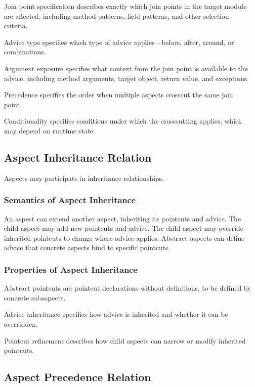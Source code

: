 \documentclass[11pt]{article}
\begin{document}
Join point specification describes exactly which join points in the target module are affected, including method patterns, field patterns, and other selection criteria.

Advice type specifies which type of advice applies---before, after, around, or combinations.

Argument exposure specifies what context from the join point is available to the advice, including method arguments, target object, return value, and exceptions.

Precedence specifies the order when multiple aspects crosscut the same join point.

Conditionality specifies conditions under which the crosscutting applies, which may depend on runtime state.

\subsection{Aspect Inheritance Relation}

Aspects may participate in inheritance relationships.

\subsubsection{Semantics of Aspect Inheritance}

An aspect can extend another aspect, inheriting its pointcuts and advice. The child aspect may add new pointcuts and advice. The child aspect may override inherited pointcuts to change where advice applies. Abstract aspects can define advice that concrete aspects bind to specific pointcuts.

\subsubsection{Properties of Aspect Inheritance}

Abstract pointcuts are pointcut declarations without definitions, to be defined by concrete subaspects.

Advice inheritance specifies how advice is inherited and whether it can be overridden.

Pointcut refinement describes how child aspects can narrow or modify inherited pointcuts.

\subsection{Aspect Precedence Relation}
\end{document}
